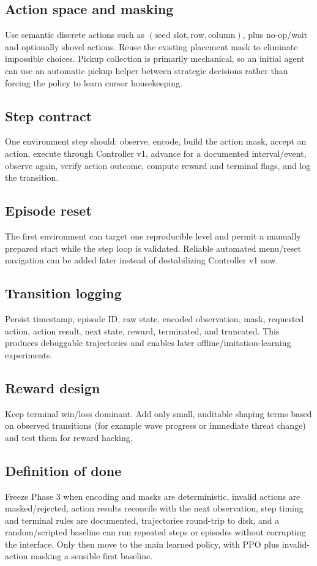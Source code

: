 \documentclass[11pt,a4paper]{article}
\begin{document}
\subsection{Action space and masking}
Use semantic discrete actions such as \((\text{seed slot},\text{row},\text{column})\), plus no-op/wait and optionally shovel actions. Reuse the existing placement mask to eliminate impossible choices. Pickup collection is primarily mechanical, so an initial agent can use an automatic pickup helper between strategic decisions rather than forcing the policy to learn cursor housekeeping.
\subsection{Step contract}
One environment step should: observe, encode, build the action mask, accept an action, execute through Controller v1, advance for a documented interval/event, observe again, verify action outcome, compute reward and terminal flags, and log the transition.
\subsection{Episode reset}
The first environment can target one reproducible level and permit a manually prepared start while the step loop is validated. Reliable automated menu/reset navigation can be added later instead of destabilizing Controller v1 now.
\subsection{Transition logging}
Persist timestamp, episode ID, raw state, encoded observation, mask, requested action, action result, next state, reward, terminated, and truncated. This produces debuggable trajectories and enables later offline/imitation-learning experiments.
\subsection{Reward design}
Keep terminal win/loss dominant. Add only small, auditable shaping terms based on observed transitions (for example wave progress or immediate threat change) and test them for reward hacking.
\subsection{Definition of done}
Freeze Phase 3 when encoding and masks are deterministic, invalid actions are masked/rejected, action results reconcile with the next observation, step timing and terminal rules are documented, trajectories round-trip to disk, and a random/scripted baseline can run repeated steps or episodes without corrupting the interface. Only then move to the main learned policy, with PPO plus invalid-action masking a sensible first baseline.
\end{document}

